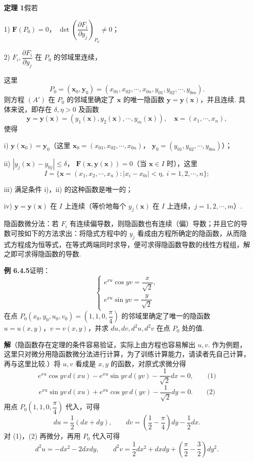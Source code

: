 \documentclass[UTF8, 12pt, fontset=fandol, oneside]{ctexart}
\begin{document}
\noindent\textbf{定理 1}\quad 假若

1) $\mathbf F(P_0)=0$，
$\det\left(\dfrac{\partial F_i}{\partial y_j}\right)_{P_0}\ne0$；

2) $F_i,\dfrac{\partial F_i}{\partial y_j}$ 在 $P_0$ 的邻域里连续，

\noindent 这里
\[
  P_0=(\mathbf x_0,\mathbf y_0)
  =(x_{01},x_{02},\cdots,x_{0n},y_{01},y_{02},\cdots,y_{0m}).
\]
则方程 $(A')$ 在 $P_0$ 的邻域里确定了 $\mathbf x$ 的唯一隐函数
$\mathbf y=\mathbf y(\mathbf x)$，并且连续. 具体来说，即存在
$\delta,\eta>0$ 及函数
\[
  \mathbf y=\mathbf y(\mathbf x)
  =(y_1(\mathbf x),y_2(\mathbf x),\cdots,y_m(\mathbf x)),
  \quad \mathbf x=(x_1,\cdots,x_n),
\]
使得

i) $\mathbf y(\mathbf x_0)=\mathbf y_0$（这里
$\mathbf x_0=(x_{01},x_{02},\cdots,x_{0n})$，
$\mathbf y_0=(y_{01},y_{02},\cdots,y_{0m})$）；

ii) $|y_j(\mathbf x)-y_{0j}|\le\delta$，
$\mathbf F(\mathbf x,\mathbf y(\mathbf x))=0$（当 $\mathbf x\in I$ 时），这里
\[
  I=\{\mathbf x=(x_1,x_2,\cdots,x_n): |x_i-x_{0i}|<\eta,\ i=1,2,\cdots,n\};
\]

iii) 满足条件 i)，ii) 的这种函数是唯一的；

iv) $\mathbf y=\mathbf y(\mathbf x)$ 在 $I$ 上连续（等价地每个 $y_j(\mathbf x)$ 在 $I$ 上连续，$j=1,2,\cdots,m$）.

\noindent 隐函数微分法：若 $F_i$ 有连续偏导数，则隐函数也有连续（偏）导数；并且它的导数可按如下的方法求出：将隐式方程中的 $y_j$ 看成由方程所确定的隐函数，从而隐式方程成为恒等式，在等式两端同时求导，便可求得隐函数导数的线性方程组，解之即可求得隐函数的导数.

\noindent\textbf{例 6.4.5}\quad 证明：
\[
\begin{cases}
  e^{xu}\cos yv=\dfrac{x}{\sqrt2},\\[4pt]
  e^{xu}\sin yv=\dfrac{y}{\sqrt2}
\end{cases}
\]
在点 $P_0(x_0,y_0,u_0,v_0)=\left(1,1,0,\dfrac\pi4\right)$ 的邻域里确定了唯一的隐函数
$u=u(x,y)$，$v=v(x,y)$，并求 $du,dv,d^2u,d^2v$ 在点 $P_0$ 处的值.

\noindent\textbf{解}\quad （隐函数存在定理的条件容易验证，实际上由方程也容易解出 $u,v$. 作为例题，这里只对微分用隐函数微分法进行计算，为了训练计算能力，请读者先自己计算，再与这里比较.）将 $u,v$ 看成是 $x,y$ 的函数，对原式求微分得
\[
  e^{xu}\cos yv\,d(xu)-e^{xu}\sin yv\,d(yv)-\frac1{\sqrt2}dx=0, \qquad\text{(1)}
\]
\[
  e^{xu}\sin yv\,d(xu)+e^{xu}\cos yv\,d(yv)-\frac1{\sqrt2}dy=0. \qquad\text{(2)}
\]
用点 $P_0\left(1,1,0,\dfrac\pi4\right)$ 代入，可得
\[
  du=\frac12(dx+dy),\qquad
  dv=\left(\frac12-\frac\pi4\right)dy-\frac12dx.
\]
对 (1)，(2) 再微分，再用 $P_0$ 代入可得
\[
  d^2u=-dx^2-2dxdy,\qquad
  d^2v=\frac12dx^2+dxdy+\left(\frac\pi2-\frac32\right)dy^2.
\]
\end{document}
